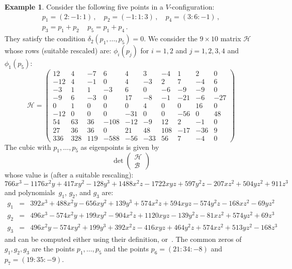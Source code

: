 \documentclass{amsart}
\theoremstyle{plain}
\theoremstyle{definition}
\newtheorem{es}[lemma]{Example}
\begin{document}
\begin{es} Consider the following five points in a $V$-configuration:
\begin{gather*}
p_1 = (2: -1: 1) \,, \quad p_2 = (-1: 1: 3) \,, \quad p_4 = (3: 6: -1) \,, \\
p_3 = p_1+p_2 \, \quad p_5 = p_1+p_4 \,.
\end{gather*}
They satisfy the condition $\delta_2(p_1, \dots, p_5) = 0$.
We consider the $9\times 10$ matrix $\mathcal{H}$ whose rows
(suitable rescaled) are:
$\phi_i(p_j)$ for $i = 1, 2$ and $j = 1, 2, 3, 4$ and $\phi_1(p_5)$:
\[
\mathcal{H} =
\left(\begin{array}{rrrrrrrrrr}
12 & 4 & -7 & 6 & 4 & 3 & -4 & 1 & 2 & 0 \\
-12 & 4 & -1 & 0 & 4 & -3 & 2 & 7 & -4 & 6 \\
-3 & 1 & 1 & -3 & 6 & 0 & -6 & -9 & -9 & 0 \\
-9 & 6 & -3 & 0 & 17 & -8 & -1 & -21 & -6 & -27 \\
0 & 1 & 0 & 0 & 0 & 4 & 0 & 0 & 16 & 0 \\
-12 & 0 & 0 & 0 & -31 & 0 & 0 & -56 & 0 & 48 \\
54& 63& 36& -108& -12& -9& 12& 2& -1& 0\\
27 & 36 & 36 & 0 & 21 & 48 & 108 & -17 & -36 & 9 \\
336& 328& 119& -588& -56& -33& 56& 7& -4& 0
\end{array}
\right)
\]
The cubic with $p_1, \dots, p_5$ as eigenpoints is given by
\[
\det \left(
\begin{array}{c}
\mathcal{H}\\
\mathcal{B}
\end{array}
\right)
\]
whose value is (after a suitable rescaling):
\[
766x^3 - 1176x^2y + 417xy^2 - 128y^3 + 1488x^2z - 1722xyz
+ 597y^2z - 207xz^2 + 504yz^2 + 911z^3
\]
and polynomials~$g_1$, $g_2$, and $g_3$ are:
\begin{eqnarray*}
g_1 & = & 392x^3 + 488x^2y - 656xy^2 + 139y^3 + 574x^2z + 594xyz - 574y^2z - 168xz^2 - 69yz^2\\
g_2 & = & 496x^3 - 574x^2y + 199xy^2 - 904x^2z + 1120xyz - 139y^2z - 81xz^2 + 574yz^2 + 69z^3\\
g_3 & = & 496x^2y - 574xy^2 + 199y^3 + 392x^2z - 416xyz + 464y^2z + 574xz^2 + 513yz^2 - 168z^3
\end{eqnarray*}
and can be computed either using their definition,
or~.
The common zeros of $g_1, g_2, g_3$ are the points $p_1, \dots, p_5$
and the points $p_6 = (21: 34: -8)$ and $p_7 = (19: 35: -9)$.
\end{es}
\end{document}
